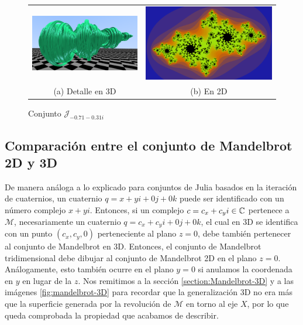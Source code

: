 \begin{figure}[ht]
    \centering
    \begin{tabular}{cc}
        \includegraphics[scale=0.42]{img/C8/julia-3D-oblicuo-2.png} &
        \includegraphics[scale=0.28]{img/C8/julia-2D-2.png} \\
          
    (a) Detalle en 3D & (b) En 2D  \\
    \end{tabular}
    \caption{Conjunto $\mathcal{J}_{-0.71-0.31i}$}
    \label{fig:julia-2D-3D-2}
\end{figure}

\subsection{Comparación entre el conjunto de Mandelbrot 2D y 3D}

De manera análoga a lo explicado para conjuntos de Julia basados en la iteración de cuaternios, un cuaternio $q=x+yi+0j+0k$ puede ser identificado con un número complejo $x+yi$. Entonces, si un complejo $c=c_x+c_yi\in\mathbb{C}$ pertenece a $\mathcal{M}$, necesariamente un cuaternio $q=c_x+c_yi+0j+0k$, el cual en 3D se identifica con un punto $(c_x,c_y,0)$ perteneciente al plano $z=0$, debe también pertenecer al conjunto de Mandelbrot en 3D. Entonces, el conjunto de Mandelbrot tridimensional debe dibujar al conjunto de Mandelbrot 2D en el plano $z=0$. Análogamente, esto también ocurre en el plano $y=0$ si anulamos la coordenada en $y$ en lugar de la $z$. Nos remitimos a la sección \ref{section:Mandelbrot-3D} y a las imágenes \ref{fig:mandelbrot-3D} para recordar que la generalización 3D no era más que la superficie generada por la revolución de $\mathcal{M}$ en torno al eje $X$, por lo que queda comprobada la propiedad que acabamos de describir.


